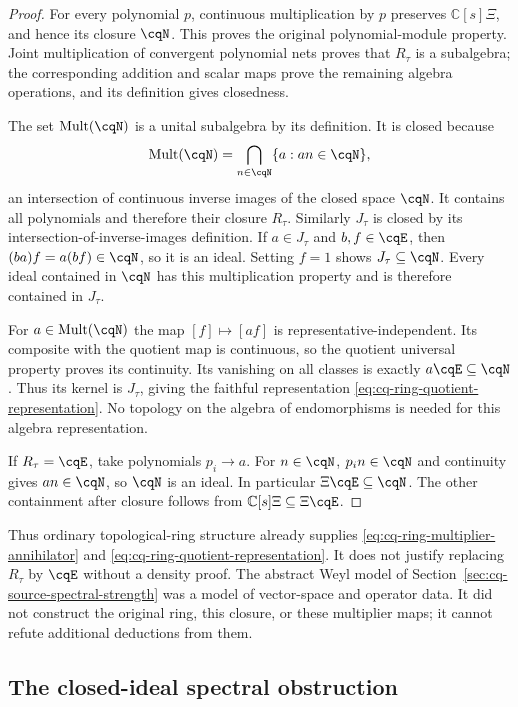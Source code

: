 \begin{proof}
For every polynomial $p$, continuous multiplication by
$p$ preserves $\mathbb C[s]\Xi$, and hence its closure
$\cqN$. This proves the original polynomial-module
property. Joint multiplication of convergent polynomial
nets proves that $R_\tau$ is a subalgebra; the corresponding
addition and scalar maps prove the remaining algebra
operations, and its definition gives closedness.

The set $\operatorname{Mult}(\cqN)$ is a unital subalgebra
by its definition. It is closed because
\[
 \operatorname{Mult}(\cqN)
 =\bigcap_{n\in\cqN}\{a:an\in\cqN\},
\]
an intersection of continuous inverse images of the closed
space $\cqN$. It contains all polynomials and therefore
their closure $R_\tau$. Similarly $J_\tau$ is closed by
its intersection-of-inverse-images definition.
If $a\in J_\tau$ and $b,f\in\cqE$, then
$(ba)f=a(bf)\in\cqN$, so it is an ideal. Setting $f=1$
shows $J_\tau\subseteq\cqN$. Every ideal contained in
$\cqN$ has this multiplication property and is therefore
contained in $J_\tau$.

For $a\in\operatorname{Mult}(\cqN)$ the map $[f]\mapsto[af]$
is representative-independent. Its composite with the
quotient map is continuous, so the quotient universal
property proves its continuity. Its vanishing on all
classes is exactly $a\cqE\subseteq\cqN$. Thus its kernel
is $J_\tau$, giving the faithful representation
\eqref{eq:cq-ring-quotient-representation}. No topology
on the algebra of endomorphisms is needed for this
algebra representation.

If $R_\tau=\cqE$, take polynomials $p_i\to a$.
For $n\in\cqN$, $p_in\in\cqN$ and continuity gives
$an\in\cqN$, so $\cqN$ is an ideal. In particular
$\Xi\cqE\subseteq\cqN$. The other containment after
closure follows from
$\mathbb C[s]\Xi\subseteq\Xi\cqE$.
\end{proof}

Thus ordinary topological-ring structure already supplies
\eqref{eq:cq-ring-multiplier-annihilator} and
\eqref{eq:cq-ring-quotient-representation}. It does not
justify replacing $R_\tau$ by $\cqE$ without a density
proof. The abstract Weyl model of
Section~\ref{sec:cq-source-spectral-strength} was a model
of vector-space and operator data. It did not construct
the original ring, this closure, or these multiplier maps;
it cannot refute additional deductions from them.

\subsection{The closed-ideal spectral obstruction}

